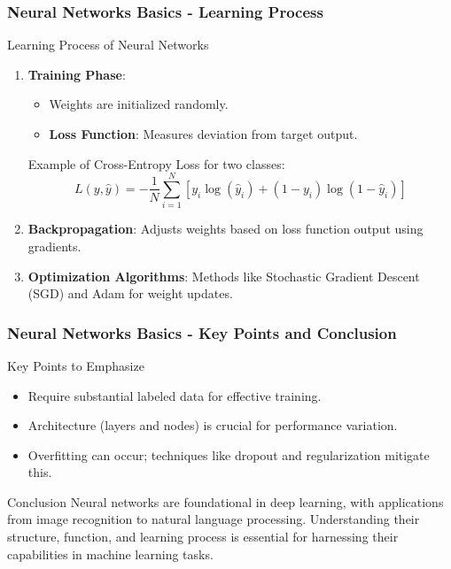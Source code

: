 \documentclass[aspectratio=169]{beamer}
\begin{document}
\begin{frame}[fragile]
    \frametitle{Neural Networks Basics - Learning Process}
    \begin{block}{Learning Process of Neural Networks}
        \begin{enumerate}
            \item \textbf{Training Phase}:
            \begin{itemize}
                \item Weights are initialized randomly.
                \item \textbf{Loss Function}: Measures deviation from target output.
                \end{itemize}
                Example of Cross-Entropy Loss for two classes:
                \[
                L(y, \hat{y}) = -\frac{1}{N} \sum_{i=1}^{N} [y_i \log(\hat{y}_i) + (1 - y_i) \log(1 - \hat{y}_i)]
                \]
            \item \textbf{Backpropagation}: Adjusts weights based on loss function output using gradients.
            \item \textbf{Optimization Algorithms}: Methods like Stochastic Gradient Descent (SGD) and Adam for weight updates.
        \end{enumerate}
    \end{block}
\end{frame}

\begin{frame}[fragile]
    \frametitle{Neural Networks Basics - Key Points and Conclusion}
    \begin{block}{Key Points to Emphasize}
        \begin{itemize}
            \item Require substantial labeled data for effective training.
            \item Architecture (layers and nodes) is crucial for performance variation.
            \item Overfitting can occur; techniques like dropout and regularization mitigate this.
        \end{itemize}
    \end{block}
    
    \begin{block}{Conclusion}
        Neural networks are foundational in deep learning, with applications from image recognition to natural language processing. 
        Understanding their structure, function, and learning process is essential for harnessing their capabilities in machine learning tasks.
    \end{block}
\end{frame}
\end{document}

